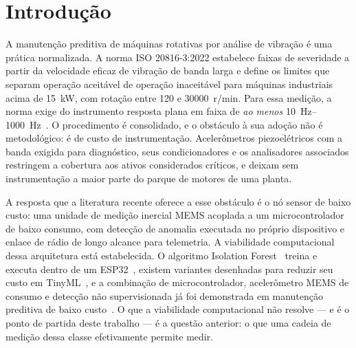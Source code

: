 
\makeatletter
{}
\makeatother

\chapter{Introdução}
\label{cap:introducao}

A manutenção preditiva de máquinas rotativas por análise de vibração é uma prática
normalizada. A norma ISO 20816-3:2022 estabelece faixas de severidade a partir da
velocidade eficaz de vibração de banda larga e define os limites que separam operação
aceitável de operação inaceitável para máquinas industriais acima de
\SI{15}{\kilo\watt}, com rotação entre \num{120} e \num{30000}~r/min. Para essa medição,
a norma exige do instrumento resposta plana em faixa de \emph{ao menos}
\SIrange{10}{1000}{\hertz}~\cite{iso208163_2022}. O procedimento é
consolidado, e o obstáculo à sua adoção não é metodológico: é de custo de instrumentação.
Acelerômetros piezoelétricos com a banda exigida para diagnóstico, seus condicionadores e
os analisadores associados restringem a cobertura aos ativos considerados críticos, e
deixam sem instrumentação a maior parte do parque de motores de uma planta.

A resposta que a literatura recente oferece a esse obstáculo é o nó sensor de baixo custo:
uma unidade de medição inercial MEMS acoplada a um microcontrolador de baixo consumo, com
detecção de anomalia executada no próprio dispositivo e enlace de rádio de longo alcance
para telemetria. A viabilidade computacional dessa arquitetura está estabelecida. O
algoritmo Isolation Forest~\cite{liu2008} treina e executa dentro de um
ESP32~\cite{antonini2023}, existem variantes desenhadas para reduzir seu custo em
TinyML~\cite{barbariol2022}, e a combinação de microcontrolador, acelerômetro MEMS de
consumo e detecção não supervisionada já foi demonstrada em manutenção preditiva de baixo
custo~\cite{kolok2025}. O que a viabilidade computacional não resolve --- e é o ponto de
partida deste trabalho --- é a questão anterior: o que uma cadeia de medição dessa classe
efetivamente permite medir.

